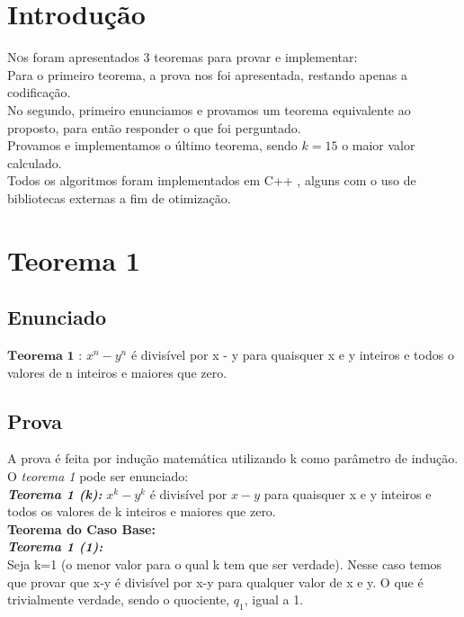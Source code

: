 \documentclass[twoside]{article}
\begin{document}
\begin{multicols}{2} %

\section{Introdução}

\lettrine[nindent=0em,lines=3]{N}os foram apresentados 3 teoremas para provar e implementar:
\\\indent Para o primeiro teorema, a prova nos foi apresentada, restando apenas a codificação.
\\\indent No segundo, primeiro enunciamos e provamos um teorema equivalente ao proposto, para então responder o que foi perguntado.
\\\indent Provamos e implementamos o último teorema, sendo $k = 15$ o maior valor calculado.
\\\indent Todos os algoritmos foram implementados em C++ , alguns com o uso de bibliotecas externas a fim de otimização.

\section{Teorema 1}

\subsection{ Enunciado }
\indent  $\mathbf{Teorema}$ $\mathbf{1}$ : $x^n - y^n$ é divisível por x - y para quaisquer x e y inteiros e todos o valores de n inteiros e maiores que zero.


\subsection{ Prova }
\indent A prova é feita por indução matemática utilizando k como parâmetro de indução. O \textit{teorema 1} pode ser enunciado:\\

\textit{\textbf{Teorema 1 (k):}} $x^k-y^k $ é divisível por $x-y$ para quaisquer x e y inteiros e todos os valores de k inteiros e maiores que zero.\\

\textbf{Teorema do Caso Base:}\\

\textit{\textbf{Teorema 1 (1):}}\\
Seja k=1 (o menor valor para o qual k tem que ser verdade). Nesse caso temos que provar que x-y é divisível por x-y para qualquer valor de x e y. O que é trivialmente verdade, sendo o quociente, $q_1$, igual a 1.\\


\end{multicols}
\end{document}

